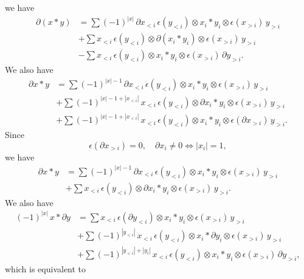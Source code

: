 we have
\begin{equation} \label{e:boundary of product 1}
\begin{split}
\partial(x \ast y) & = 
\sum (-1)^{|x|} \, \partial x_{<i}\, \epsilon(y_{<i}) \otimes x_i \ast y_i \otimes \epsilon(x_{>i})\, y_{>i} \\ & +
\sum x_{<i} \, \epsilon(y_{<i}) \otimes \partial (x_i \ast y_i) \otimes \epsilon(x_{>i})\, y_{>i} \\ & -
\sum x_{<i} \, \epsilon(y_{<i}) \otimes x_i \ast y_i \otimes \epsilon(x_{>i})\, \partial y_{>i}.
\end{split}
\end{equation}
We also have
\begin{align*}
\partial x \ast y & = 
\sum (-1)^{|x|-1} \, \partial x_{<i}\, \epsilon(y_{<i}) \otimes x_i \ast y_i \otimes \epsilon(x_{>i}) \, y_{>i} \\ & +
\sum (-1)^{|x|-1+|x_{<i}|} \, x_{<i}\, \epsilon(y_{<i}) \otimes \partial x_i \ast y_i \otimes \epsilon(x_{>i}) \, y_{>i} \\ & +
\sum (-1)^{|x|-1+|x_{<i}|} \, x_{<i}\, \epsilon(y_{<i}) \otimes x_i \ast y_i \otimes \epsilon(\partial x_{>i}) \, y_{>i}.
\end{align*}
Since
\begin{equation*}
\epsilon(\partial x_{>i}) = 0, \quad \partial x_i \neq 0 \Leftrightarrow |x_i| = 1,
\end{equation*}
we have
\begin{equation} \label{e:boundary of product 2}
\begin{split}
\partial x \ast y & = 
\sum (-1)^{|x|-1} \, \partial x_{<i}\, \epsilon(y_{<i}) \otimes x_i \ast y_i \otimes \epsilon(x_{>i})\, y_{>i} \\ & +
\sum x_{<i}\, \epsilon(y_{<i}) \otimes \partial x_i \ast y_i \otimes \epsilon(x_{>i})\, y_{>i}.
\end{split}
\end{equation}
We also have
\begin{align*}
(-1)^{|x|} \, x \ast \partial y & = 
\sum x_{<i} \, \epsilon(\partial y_{<i}) \otimes x_i \ast y_i \otimes \epsilon(x_{>i})\, y_{>i} \\ & +
\sum (-1)^{|y_{<i}|} \, x_{<i}\, \epsilon(y_{<i}) \otimes x_i \ast \partial y_i \otimes \epsilon(x_{>i}) \, y_{>i} \\ & +
\sum (-1)^{|y_{<i}| + |y_i|} \, x_{<i}\, \epsilon(y_{<i}) \otimes x_i \ast y_i \otimes \epsilon(x_{>i}) \, \partial y_{>i},
\end{align*}
which is equivalent to
